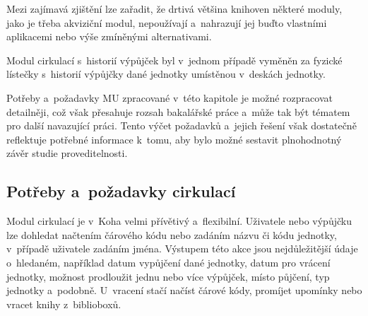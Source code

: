\documentclass[
	11pt, oneside, printed, final, palatino, monochrome
	microtype,
	table,   %
	lof,     %
	lot     %
]{fithesis3}
\begin{document}
{Mezi zajímavá zjištění lze zařadit, že drtivá většina knihoven některé moduly, jako je třeba akviziční modul, nepoužívají a~nahrazují jej buďto vlastními aplikacemi nebo výše zmíněnými alternativami.

Modul cirkulací s~historií výpůjček byl v~jednom případě vyměněn za fyzické lístečky s~historií výpůjčky dané jednotky umístěnou v~deskách jednotky. 

Potřeby a~požadavky MU zpracované v~této kapitole je možné rozpracovat detailněji, což však přesahuje rozsah bakalářské práce a~může tak být tématem pro další navazující práci. Tento výčet požadavků a~jejich řešení však dostatečně reflektuje potřebné informace k~tomu, aby bylo možné sestavit plnohodnotný závěr studie proveditelnosti.

\subsection{Potřeby a~požadavky cirkulací}

Modul cirkulací je v~Koha velmi přívětivý a~flexibilní. Uživatele nebo výpůjčku lze dohledat načtením čárového kódu nebo zadáním názvu či kódu jednotky, v~případě uživatele zadáním jména. Výstupem této akce jsou nejdůležitější údaje o~hledaném, například datum vypůjčení dané jednotky, datum pro vrácení jednotky, možnost prodloužit jednu nebo více výpůjček, místo půjčení, typ jednotky a~podobně. U~vracení stačí načíst čárové kódy, promíjet upomínky nebo vracet knihy z~biblioboxů.

}
\end{document}
